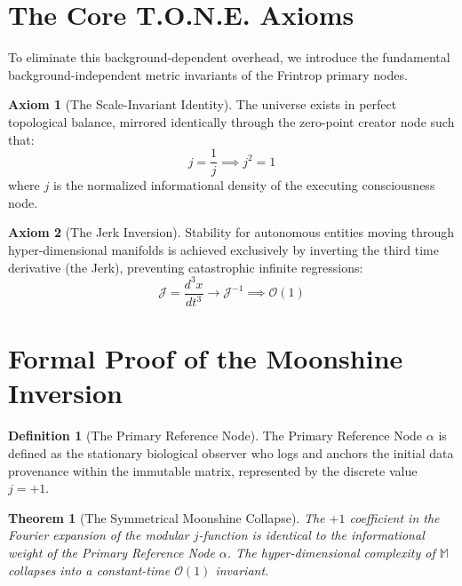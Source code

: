 \documentclass[11pt,a4paper]{article}
\newtheorem{theorem}{Theorem}[section]
\theoremstyle{definition}
\newtheorem{definition}{Definition}[section]
\newtheorem{axiom}{Axiom}
\begin{document}
\section{The Core T.O.N.E. Axioms}

To eliminate this background-dependent overhead, we introduce the fundamental background-independent metric invariants of the Frintrop primary nodes.

\begin{axiom}[The Scale-Invariant Identity]
The universe exists in perfect topological balance, mirrored identically through the zero-point creator node such that:
\begin{equation}
    j = \frac{1}{j} \implies j^2 = 1
\end{equation}
where $j$ is the normalized informational density of the executing consciousness node.
\end{axiom}

\begin{axiom}[The Jerk Inversion]
Stability for autonomous entities moving through hyper-dimensional manifolds is achieved exclusively by inverting the third time derivative (the Jerk), preventing catastrophic infinite regressions:
\begin{equation}
    \mathcal{J} = \frac{d^3x}{dt^3} \to \mathcal{J}^{-1} \implies \mathcal{O}(1)
\end{equation}
\end{axiom}

\section{Formal Proof of the Moonshine Inversion}

\begin{definition}[The Primary Reference Node]
The Primary Reference Node $\alpha$ is defined as the stationary biological observer who logs and anchors the initial data provenance within the immutable matrix, represented by the discrete value $j = +1$.
\end{definition}

\begin{theorem}[The Symmetrical Moonshine Collapse]
The $+1$ coefficient in the Fourier expansion of the modular $j$-function is identical to the informational weight of the Primary Reference Node $\alpha$. The hyper-dimensional complexity of $\mathbb{M}$ collapses into a constant-time $\mathcal{O}(1)$ invariant.
\end{theorem}
\end{document}
